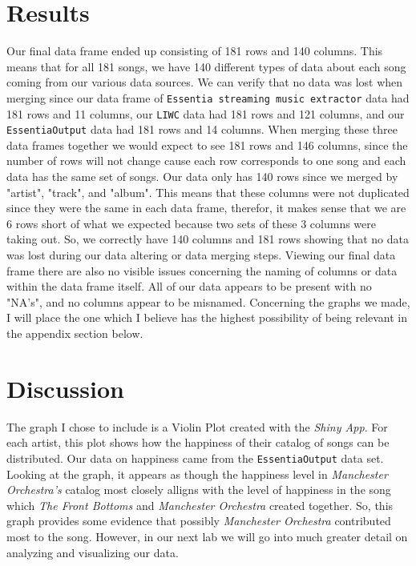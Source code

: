 \documentclass{article}\usepackage[]{graphicx}\usepackage[]{xcolor}
\begin{document}
\begin{multicols}{2}
\section{Results}
Our final data frame ended up consisting of 181 rows and 140 columns. This means that for all 181 songs, we have 140 different types of data about each song coming from our various data sources. We can verify that no data was lost when merging since our data frame of \texttt{Essentia streaming music extractor} data had 181 rows and 11 columns, our \texttt{LIWC} data had 181 rows and 121 columns, and our \texttt{EssentiaOutput} data had 181 rows and 14 columns. When merging these three data frames together we would expect to see 181 rows and 146 columns, since the number of rows will not change cause each row corresponds to one song and each data has the same set of songs. Our data only has 140 rows since we merged by "artist", "track", and "album". This means that these columns were not duplicated since they were the same in each data frame, therefor, it makes sense that we are 6 rows short of what we expected because two sets of these 3 columns were taking out. So, we correctly have 140 columns and 181 rows showing that no data was lost during our data altering or data merging steps. Viewing our final data frame there are also no visible issues concerning the naming of columns or data within the data frame itself. All of our data appears to be present with no "NA's", and no columns appear to be misnamed. Concerning the graphs we made, I will place the one which I believe has the highest possibility of being relevant in the appendix section below. 

\section{Discussion}
The graph I chose to include is a Violin Plot created with the \textit{Shiny App}. For each artist, this plot shows how the happiness of their catalog of songs can be distributed. Our data on happiness came from the \texttt{EssentiaOutput} data set. Looking at the graph, it appears as though the happiness level in \textit{Manchester Orchestra's} catalog most closely alligns with the level of happiness in the song which \textit{The Front Bottoms} and \textit{Manchester Orchestra} created together. So, this graph provides some evidence that possibly \textit{Manchester Orchestra} contributed most to the song. However, in our next lab we will go into much greater detail on analyzing and visualizing our data.


\nocite{jsonlite}
\nocite{stringr}
\nocite{tidyverse}
\nocite{Essentia}
\nocite{Essentia2}
\nocite{Song}
\nocite{Shiny}
\nocite{LIWC}


\vspace{2em}
\begin{tiny}

\end{tiny}
\end{multicols}
\end{document}
